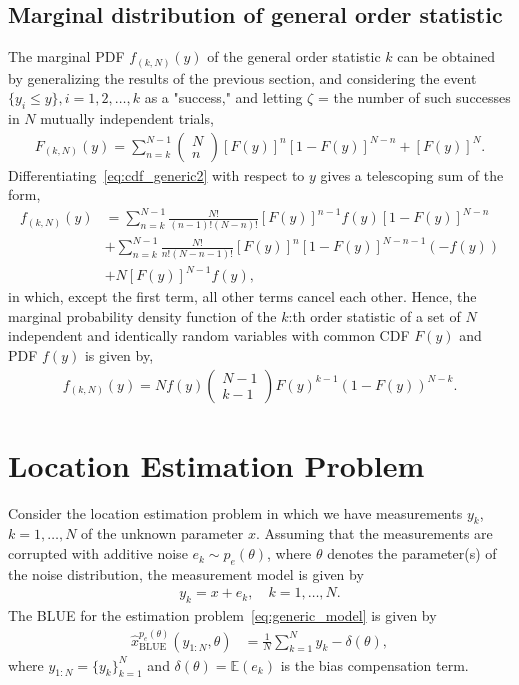 \documentclass{article}
\begin{document}
\subsection{Marginal distribution of general order statistic}\label{subsec:marginal_distribution_of_general_order_statistic}
The marginal PDF $f_{(k,N)}(y)$ of the general order statistic $k$ can be obtained by generalizing the results of the previous section, and considering the event $\{y_i \leq y\}, i = 1, 2, \ldots, k$ as a "success," and letting $\zeta$ = the number of such successes in $N$ mutually independent trials,
%
%
	\begin{align}
	F_{(k,N)}(y)=\sum_{n=k}^{N-1}\begin{pmatrix}N\\n\end{pmatrix}[F(y)]^n[1-F(y)]^{N-n}+[F(y)]^N.
	\label{eq:cdf_generic2}
	\end{align}
%
%
Differentiating~\eqref{eq:cdf_generic2} with respect to $y$ gives a telescoping sum of the form,
%
%
\begin{align}
f_{(k,N)}(y)&=\sum_{n=k}^{N-1}\frac{N!}{(n-1)!(N-n)!}[F(y)]^{n-1}f(y)[1-F(y)]^{N-n}\nonumber\\ &+ \sum_{n=k}^{N-1}\frac{N!}{n!(N-n-1)!}[F(y)]^n[1-F(y)]^{N-n-1}(-f(y)) \nonumber\\&+ N[F(y)]^{N-1}f(y),
\end{align}
%
%
in which, except the first term, all other terms cancel each other. Hence, the marginal probability density function of the $k$:th order statistic of a set of $N$ independent and identically random variables with common CDF $F(y)$ and PDF $f(y)$ is given by,
%
%
\begin{align}
f_{(k,N)}(y) = Nf(y)\begin{pmatrix}N-1\\k-1\end{pmatrix}F(y)^{k-1}\left(1-F(y)\right)^{N-k}.
\label{eq:density_order}
\end{align}
\section{Location Estimation Problem}\label{sec:location_estimation_problem}
Consider the location estimation problem in which we have measurements $y_k$, $k=1,\ldots,N$ of the unknown parameter $x$. Assuming that the measurements are corrupted with additive noise $e_k\sim p_e(\theta)$, where $\theta$ denotes the parameter(s) of the noise distribution, the measurement model is given by
%
%
\begin{align}
y_k=x+e_k, \quad k=1,\ldots,N.
\label{eq:generic_model}
\end{align}
%
%
The BLUE for the estimation problem~\eqref{eq:generic_model} is given by
%
%
\begin{align}
\hat{x}_{\mathrm{BLUE}}^{p_e(\theta)}(y_{1:N},\theta) &= \frac{1}{N}\sum_{k=1}^N y_k- \delta(\theta),
\label{eq:mean_estimator}
\end{align}
%
%
where $y_{1:N} = \{y_k\}_{k=1}^{N}$ and $\delta(\theta)=\mathbb{E}(e_k)$ is the bias compensation term.
\end{document}
